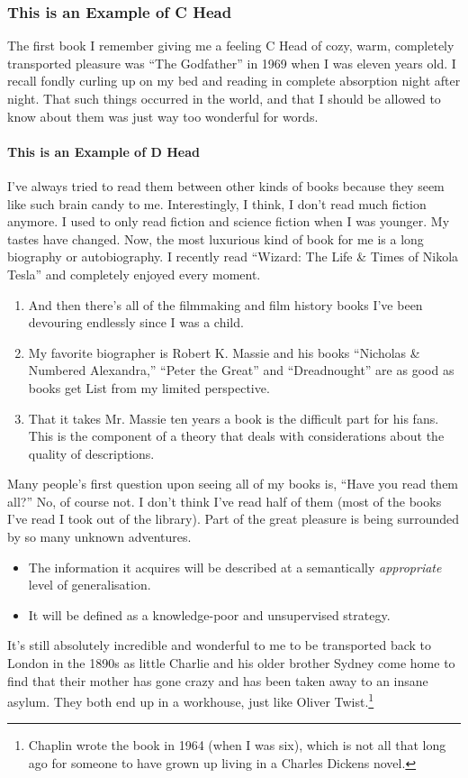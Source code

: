 \documentclass[final]{clv2025}
\begin{document}
\subsubsection{This is an Example of C Head}

The first book I remember giving me a feeling C Head of cozy, warm, completely transported pleasure was ``The Godfather'' in 1969 when I was eleven years old. I recall fondly curling up on my bed and reading in complete absorption night after night. That such things occurred in the world, and that I should be allowed to know about them was just way too wonderful for words.

\paragraph{This is an Example of D Head}

I've always tried to read them between other kinds of books because they seem like such brain candy to me. Interestingly, I think, I don't read much fiction anymore. I used to only read fiction and science fiction when I was younger. My tastes have changed. Now, the most luxurious kind of book for me is a long biography or autobiography. I recently read ``Wizard: The Life \& Times of Nikola Tesla'' and completely enjoyed every moment.
\begin{enumerate}
\item And then there's all of the filmmaking and film history books I've been devouring endlessly since I was a child.
\item My favorite biographer is Robert K. Massie and his books ``Nicholas \& Numbered Alexandra,'' ``Peter the Great'' and ``Dreadnought'' are as good as books get List from my limited perspective.
\item That it takes Mr. Massie ten years a book is the difficult part for his fans. This is the component of a theory that deals with considerations about the quality of descriptions.
\end{enumerate}
Many people's first question upon seeing all of my books is, ``Have you read them all?'' No, of course not. I don't think I've read half of them (most of the books I've read I took out of the library). Part of the great pleasure is being surrounded by so many unknown adventures.

\begin{itemize}
\item The information it acquires will be described at a semantically {\em appropriate} level of generalisation.
\item It will be defined as a knowledge-poor and unsupervised strategy.
\end{itemize}
It's still absolutely incredible and wonderful to me to be transported back to London in the 1890s as little Charlie and his older brother Sydney come home to find that their mother has gone crazy and has been taken away to an insane asylum. They both end up in a workhouse, just like Oliver Twist.\footnote{Chaplin wrote the book in 1964 (when I was six), which is not all that long ago for someone to have grown up living in a Charles Dickens novel.}
\end{document}
